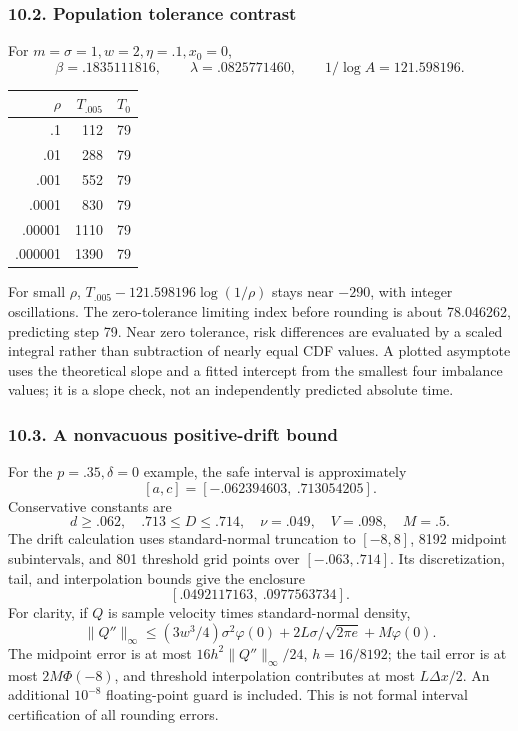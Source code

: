 \subsubsection{10.2. Population tolerance
contrast}\label{experiments-population-tolerance-contrast}

For \(m=\sigma=1,w=2,\eta=.1,x_0=0\), \[
\beta=.1835111816,\qquad\lambda=.0825771460,\qquad
1/\log A=121.598196.
\]

{\def\LTcaptype{table} %
\begin{longtable}[]{@{}rrr@{}}
\toprule\noalign{}
\(\rho\) & \(T_{.005}\) & \(T_0\) \\
\midrule\noalign{}
\endhead
\bottomrule\noalign{}
\endlastfoot
.1 & 112 & 79 \\
.01 & 288 & 79 \\
.001 & 552 & 79 \\
.0001 & 830 & 79 \\
.00001 & 1110 & 79 \\
.000001 & 1390 & 79 \\
\end{longtable}
}

For small \(\rho\), \(T_{.005}-121.598196\log(1/\rho)\) stays near
\(-290\), with integer oscillations. The zero-tolerance limiting index
before rounding is about 78.046262, predicting step 79. Near zero
tolerance, risk differences are evaluated by a scaled integral rather
than subtraction of nearly equal CDF values. A plotted asymptote uses
the theoretical slope and a fitted intercept from the smallest four
imbalance values; it is a slope check, not an independently predicted
absolute time.

\subsubsection{10.3. A nonvacuous positive-drift
bound}\label{experiments-a-nonvacuous-positive-drift-bound}

For the \(p=.35,\delta=0\) example, the safe interval is approximately
\[
[a,c]=[-.062394603,\ .713054205].
\] Conservative constants are \[
d\ge.062,\quad .713\le D\le.714,\quad
\nu=.049,\quad V=.098,\quad M=.5.
\] The drift calculation uses standard-normal truncation to \([-8,8]\),
8192 midpoint subintervals, and 801 threshold grid points over
\([-.063,.714]\). Its discretization, tail, and interpolation bounds
give the enclosure \[
[.0492117163,\ .0977563734].
\] For clarity, if \(Q\) is sample velocity times standard-normal
density, \[
\|Q''\|_\infty\le
(3w^3/4)\sigma^2\varphi(0)+
2L\sigma/\sqrt{2\pi e}+M\varphi(0).
\] The midpoint error is at most \(16h^2\|Q''\|_\infty/24\),
\(h=16/8192\); the tail error is at most \(2M\Phi(-8)\), and threshold
interpolation contributes at most \(L\Delta x/2\). An additional
\(10^{-8}\) floating-point guard is included. This is not formal
interval certification of all rounding errors.

